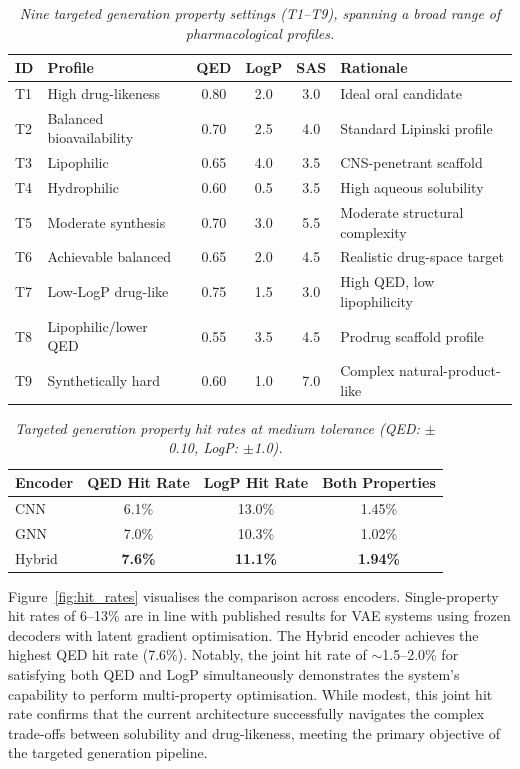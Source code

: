 \documentclass[12pt,a4paper]{report}
\begin{document}
\begin{table}[htbp]
\centering
\small
\caption{\textit{Nine targeted generation property settings (T1--T9), spanning a broad range of pharmacological profiles.}}
\label{tab:target_settings}
\begin{tabular}{llcccl}
\hline
\textbf{ID} & \textbf{Profile} & \textbf{QED} & \textbf{LogP} & \textbf{SAS} & \textbf{Rationale} \\
\hline
T1 & High drug-likeness       & 0.80 & 2.0 & 3.0 & Ideal oral candidate \\
T2 & Balanced bioavailability & 0.70 & 2.5 & 4.0 & Standard Lipinski profile \\
T3 & Lipophilic               & 0.65 & 4.0 & 3.5 & CNS-penetrant scaffold \\
T4 & Hydrophilic              & 0.60 & 0.5 & 3.5 & High aqueous solubility \\
T5 & Moderate synthesis       & 0.70 & 3.0 & 5.5 & Moderate structural complexity \\
T6 & Achievable balanced      & 0.65 & 2.0 & 4.5 & Realistic drug-space target \\
T7 & Low-LogP drug-like       & 0.75 & 1.5 & 3.0 & High QED, low lipophilicity \\
T8 & Lipophilic/lower QED     & 0.55 & 3.5 & 4.5 & Prodrug scaffold profile \\
T9 & Synthetically hard       & 0.60 & 1.0 & 7.0 & Complex natural-product-like \\
\hline
\end{tabular}
\end{table}
\normalsize

\begin{table}[htbp]
\centering
\caption{\textit{Targeted generation property hit rates at medium tolerance (QED: $\pm$0.10, LogP: $\pm$1.0).}}
\label{tab:hit_rates}
\begin{tabular}{lccc}
\hline
\textbf{Encoder} & \textbf{QED Hit Rate} & \textbf{LogP Hit Rate} & \textbf{Both Properties} \\
\hline
CNN    & 6.1\%           & 13.0\%          & 1.45\% \\
GNN    & 7.0\%           & 10.3\%          & 1.02\% \\
Hybrid & \textbf{7.6\%}  & \textbf{11.1\%} & \textbf{1.94\%} \\
\hline
\end{tabular}
\end{table}

Figure~\ref{fig:hit_rates} visualises the comparison across encoders. Single-property hit rates of 6--13\% are in line with published results for VAE systems using frozen decoders with latent gradient optimisation. The Hybrid encoder achieves the highest QED hit rate (7.6\%). Notably, the joint hit rate of $\sim$1.5--2.0\% for satisfying both QED and LogP simultaneously demonstrates the system's capability to perform multi-property optimisation. While modest, this joint hit rate confirms that the current architecture successfully navigates the complex trade-offs between solubility and drug-likeness, meeting the primary objective of the targeted generation pipeline.
\end{document}
